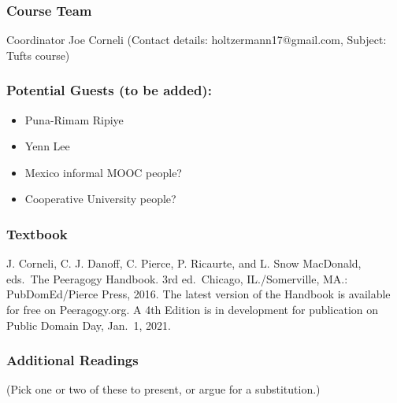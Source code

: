 \hypertarget{course-team}{%
\subsubsection{Course Team}\label{course-team}}

Coordinator Joe Corneli (Contact details: holtzermann17@gmail.com,
Subject: Tufts course)

\hypertarget{potential-guests-to-be-added}{%
\subsubsection{Potential Guests (to be
added):}\label{potential-guests-to-be-added}}

\begin{itemize}
\tightlist
\item
  Puna-Rimam Ripiye
\item
  Yenn Lee
\item
  Mexico informal MOOC people?
\item
  Cooperative University people?
\end{itemize}

\hypertarget{textbook}{%
\subsubsection{Textbook}\label{textbook}}

J. Corneli, C. J. Danoff, C. Pierce, P. Ricaurte, and L. Snow MacDonald,
eds.~The Peeragogy Handbook. 3rd ed.~Chicago, IL./Somerville, MA.:
PubDomEd/Pierce Press, 2016. The latest version of the Handbook is
available for free on Peeragogy.org. A 4th Edition is in development for
publication on Public Domain Day, Jan.~1, 2021.

\hypertarget{additional-readings}{%
\subsubsection{Additional Readings}\label{additional-readings}}

(Pick one or two of these to present, or argue for a substitution.)

